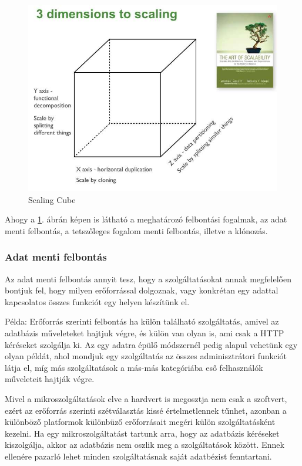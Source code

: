 \documentclass[11pt,magyar,a4paper,twoside,]{report}
\let\Oldincludegraphics\includegraphics
\renewcommand{\includegraphics}[1]{
\begin{adjustbox}{max size={\textwidth}{\textheight}}
    \Oldincludegraphics[scale=0.6]{#1}%
\end{adjustbox}
}
\begin{document}
\begin{figure}[H]
\centering
\includegraphics{img/ScaleCude.jpg}
\caption{Scaling Cube\label{scalecube}}
\end{figure}

Ahogy a \ref{scalecube}. ábrán képen is látható a meghatározó felbontási
fogalmak, az adat menti felbontás, a tetszőleges fogalom menti
felbontás, illetve a klónozás.

\subsubsection{Adat menti felbontás}\label{adat-menti-felbontuxe1s}

Az adat menti felbontás annyit tesz, hogy a szolgáltatásokat annak
megfelelően bontjuk fel, hogy milyen erőforrással dolgoznak, vagy
konkrétan egy adattal kapcsolatos összes funkciót egy helyen készítünk
el.

Példa: Erőforrás szerinti felbontás ha külön található szolgáltatás,
amivel az adatbázis műveleteket hajtjuk végre, és külön van olyan is,
ami csak a HTTP kéréseket szolgálja ki. Az egy adatra épülő módszernél
pedig alapul vehetünk egy olyan példát, ahol mondjuk egy szolgáltatás az
összes adminisztrátori funkciót látja el, míg más szolgáltatások a
más-más kategóriába eső felhasználók műveleteit hajtják végre.

Mivel a mikroszolgáltatások elve a hardvert is megosztja nem csak a
szoftvert, ezért az erőforrás szerinti szétválasztás kissé
értelmetlennek tűnhet, azonban a különböző platformok különbüző
erőforrásait megéri külön szolgáltatásként kezelni. Ha egy
mikroszolgáltatást tartunk arra, hogy az adatbázis kéréseket
kiszolgálja, akkor az adatbázis nem oszlik meg a szolgáltatások között.
Ennek ellenére pazarló lehet minden szolgáltatásnak saját adatbézist
fenntartani.
\end{document}
